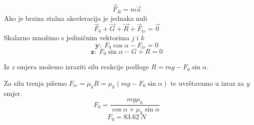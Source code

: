 

$$ \vec{F}_R=m\vec{a}$$
Ako je brzina stalna akceleracija je jednaka nuli
$$\vec{F}_0+\vec{G}+\vec{R}+\vec{F}_{tr}=\vec{0} $$
Skalarno množimo s jediničnim vektorima $j$ i $k$
$$ \textbf{y:}\ \  F_0\cos\alpha -F_{tr}=0 $$
$$  \textbf{z:}\ \ F_0\sin\alpha-G + R =0$$

Iz $z$ smjera možemo izraziti silu reakcije podloge
$R=mg-F_0\sin\alpha$.
 
Za silu trenja pišemo $F_{tr}=\mu_k R=\mu_k (mg-F_0\sin\alpha)$ te uvrštavamo u izraz za $y$ smjer.
$$
F_0=\frac{mg\mu_k}{\cos\alpha+\mu_k\sin\alpha}
$$
$$
F_0=83.62\ N
$$

